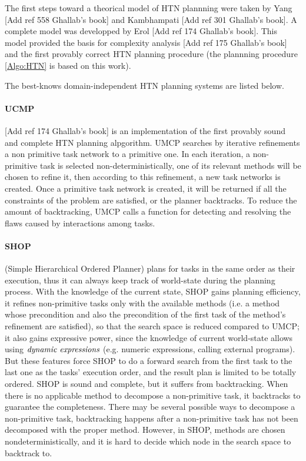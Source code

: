 The first steps toward a theorical model of HTN plannning were taken by Yang [Add ref 558 Ghallab's book] and Kambhampati [Add ref 301 Ghallab's book]. A complete model was developped by Erol [Add ref 174 Ghallab's book]. This model provided the basis for complexity analysis [Add ref 175 Ghallab's book] and the first provably correct HTN planning procedure (the plannning procedure \ref{Algo:HTN} is based on this work). 

The best-knows domain-independent HTN planning systems are listed below.

\paragraph*{UCMP}

[Add ref 174 Ghallab's book] is an implementation of the first provably sound and complete HTN planning alpgorithm. UMCP searches by iterative refinements a non primitive task network to a primitive one. In each iteration, a non-primitive task is selected non-deterministically, one of its relevant methods will be chosen to refine it, then according to this refinement, a new task networks is created. Once a primitive task network is created, it will be returned if all the constraints of the problem are satisfied, or the planner backtracks. To reduce the amount of backtracking, UMCP calls a function for detecting and resolving the flaws caused by interactions among tasks.

\paragraph*{SHOP}

\cite{4} \cite{4_1} (Simple Hierarchical Ordered Planner) plans for tasks in the same order as their execution, thus it can always keep track of world-state during the planning process. With the knowledge of the current state, SHOP gains planning efficiency, it refines non-primitive tasks only with the available methods (i.e. a method whose precondition and also the precondition of the first task of the method’s refinement are satisfied), so that the search space is reduced compared to UMCP; it also gains expressive power, since the knowledge of current world-state allows using $\emph{dynamic expressions}$ (e.g. numeric expressions, calling external programs). But these features force SHOP to do a forward search from the first task to the last one as the tasks’ execution order, and the result plan is limited to be totally ordered. SHOP is sound and complete, but it suffers from backtracking. When there is no applicable method to decompose a non-primitive task, it backtracks to guarantee the completeness. There may be several possible ways to decompose a non-primitive task, backtracking happens after a non-primitive task has not been decomposed with the proper method. However, in SHOP, methods are chosen nondeterministically, and it is hard to decide which node in the search space to backtrack to. 

